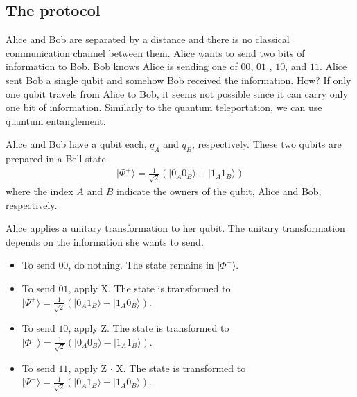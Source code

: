 \documentclass[letterpaper,10pt,english]{jupyterBook}
\begin{document}
\subsection{The protocol}
\label{\detokenize{algorithms/densecoding:the-protocol}}
\sphinxAtStartPar
Alice and Bob are separated by a distance and there is no classical communication channel between them. Alice wants to send two bits of information to Bob.  Bob knows Alice is sending one of \(00\), \(01\) , \(10\), and \(11\).  Alice sent Bob a single qubit and somehow Bob received the information.  How?  If only one qubit travels from Alice to Bob, it seems not possible since it can carry only one bit of information.  Similarly to the quantum teleportation, we can use quantum entanglement.

\sphinxAtStartPar
{}Alice and Bob have a qubit each, \(q_A\) and \(q_B\), respectively.  These two qubits are prepared in a Bell state
\begin{equation*}
\begin{split}
|\Phi^{+}\rangle = \frac{1}{\sqrt{2}}\left(|0_A 0_B\rangle + |1_A 1_B\rangle\right)
\end{split}
\end{equation*}
\sphinxAtStartPar
where the index \(A\) and \(B\) indicate the owners of the qubit, Alice and Bob, respectively.

\sphinxAtStartPar
{}Alice applies a unitary transformation to her qubit.  The unitary transformation depends on the information she wants to send.
\begin{itemize}
\item {}
\sphinxAtStartPar
To send \(00\), do nothing.  The state remains in \(|\Phi^{+}\rangle\).

\item {}
\sphinxAtStartPar
To send \(01\), apply X.  The state is transformed to \(|\Psi^{+}\rangle = \frac{1}{\sqrt{2}}\left(|0_A 1_B\rangle + |1_A 0_B\rangle\right)\).

\item {}
\sphinxAtStartPar
To send \(10\), apply Z.  The state is transformed to \(|\Phi^{-}\rangle = \frac{1}{\sqrt{2}}\left(|0_A 0_B\rangle - |1_A 1_B\rangle\right)\).

\item {}
\sphinxAtStartPar
To send \(11\), apply Z \(\cdot\) X.  The state is transformed to \(|\Psi^{-}\rangle = \frac{1}{\sqrt{2}}\left(|0_A 1_B\rangle - |1_A 0_B\rangle\right)\).

\end{itemize}
\end{document}
